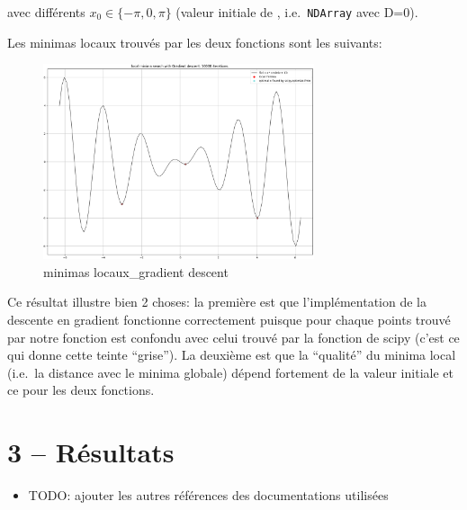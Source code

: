 \documentclass[
]{article}
\providecommand{\tightlist}{%
  \setlength{\itemsep}{0pt}\setlength{\parskip}{0pt}}
\begin{document}
avec différents \(x_0 \in \{-\pi, 0, \pi\}\) (valeur initiale de
, i.e.~\texttt{NDArray} avec D=0).

Les minimas locaux trouvés par les deux fonctions sont les suivants:

\begin{figure}
\centering
\includegraphics[width=0.71\textwidth,height=\textheight]{../res/3.1_gradient_descent_minima.png}
\caption{minimas locaux\_gradient descent}
\end{figure}

\newpage{}

Ce résultat illustre bien 2 choses: la première est que l'implémentation
de la descente en gradient fonctionne correctement puisque pour chaque
points trouvé par notre fonction est confondu avec celui trouvé par la
fonction de scipy (c'est ce qui donne cette teinte ``grise''). La
deuxième est que la ``qualité'' du minima local (i.e.~la distance avec
le minima globale) dépend fortement de la valeur initiale et ce pour les
deux fonctions.

\hypertarget{ruxe9sultats}{%
\section{3 -- Résultats}\label{ruxe9sultats}}

\printbibliography[heading=bibintoc, title={Références}]

\begin{itemize}
\tightlist
\item
  TODO: ajouter les autres références des documentations utilisées
\end{itemize}
\end{document}
